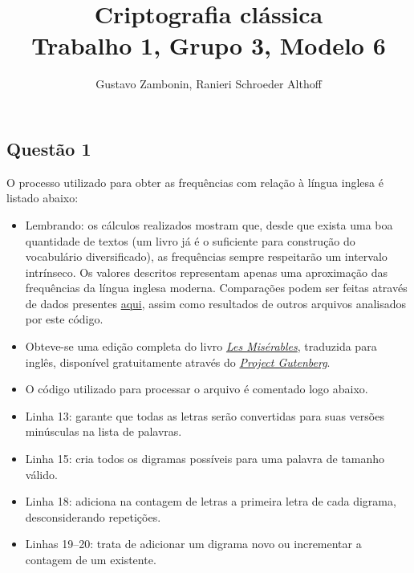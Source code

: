 \documentclass{../sftex/sftex}
\title{Criptografia clássica \\ \small{Trabalho 1, Grupo 3, Modelo 6}}
\author{Gustavo Zambonin, Ranieri Schroeder Althoff}
\begin{document}
\maketitle

\subsection*{Questão 1}

O processo utilizado para obter as frequências com relação à língua inglesa é
listado abaixo:

\begin{itemize}

    \item Lembrando: os cálculos realizados mostram que, desde que exista uma
        boa quantidade de textos (um livro já é o suficiente para construção
        do vocabulário diversificado), as frequências sempre respeitarão um
        intervalo intrínseco. Os valores descritos representam apenas uma
        aproximação das frequências da língua inglesa moderna. Comparações
        podem ser feitas através de dados presentes
        \href{http://en.wikipedia.org/wiki/Letter_frequency#Relative_frequencies_of_letters_in_the_English_language}{aqui},
        assim como resultados de outros arquivos analisados por este código.

    \item Obteve-se uma edição completa do livro
        \textit{\href{http://www.gutenberg.org/cache/epub/135/pg135.txt}{Les Misérables}},
        traduzida para inglês, disponível gratuitamente através do
        \textit{\href{http://www.gutenberg.org}{Project Gutenberg}}.

    \item O código utilizado para processar o arquivo é comentado logo abaixo.

    

    \item Linha 13: garante que todas as letras serão convertidas para suas
        versões minúsculas na lista de palavras.

    \item Linha 15: cria todos os digramas possíveis para uma palavra de
        tamanho válido.

    \item Linha 18: adiciona na contagem de letras a primeira letra de cada
        digrama, desconsiderando repetições.

    \item Linhas 19--20: trata de adicionar um digrama novo ou incrementar a
        contagem de um existente.


\end{itemize}
\end{document}
